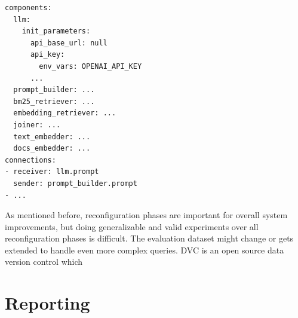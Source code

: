 \newpage
\begin{verbatim}
components:
  llm:
    init_parameters:
      api_base_url: null
      api_key:
        env_vars: OPENAI_API_KEY
      ...
  prompt_builder: ...
  bm25_retriever: ...
  embedding_retriever: ...
  joiner: ...
  text_embedder: ...
  docs_embedder: ...
connections:
- receiver: llm.prompt
  sender: prompt_builder.prompt
- ...
\end{verbatim}

As mentioned before, reconfiguration phases are important for overall system improvements, but doing generalizable and valid experiments over all reconfiguration phases is difficult. The evaluation dataset might change or gets extended to handle even more complex queries. DVC\cite{dvc.17.03.2025} is an open source data version control which 


\section{Reporting}




